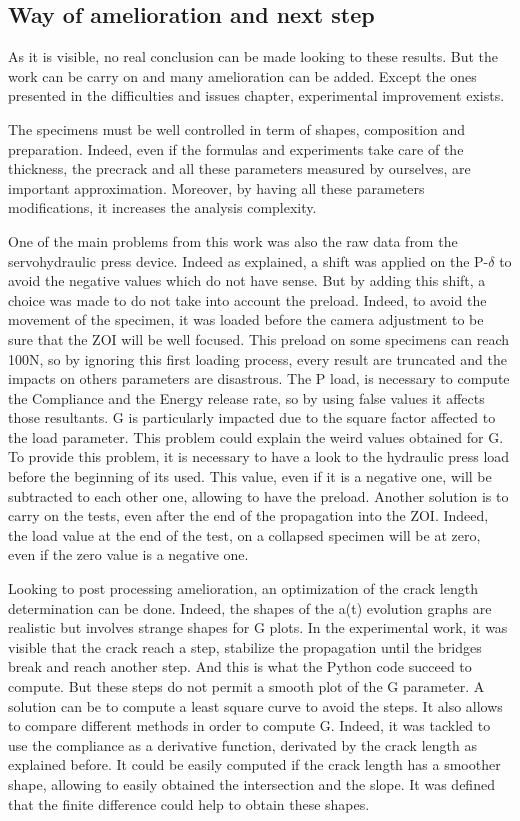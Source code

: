 \subsection{Way of amelioration and next step}

As it is visible, no real conclusion can be made looking to these results. But the work can be carry on and many amelioration can be added. Except the ones presented in the difficulties and issues chapter, experimental improvement exists. 

The specimens must be well controlled in term of shapes, composition and preparation. Indeed, even if the formulas and experiments take care of the thickness, the precrack and all these parameters measured by ourselves, are important approximation. Moreover, by having all these parameters modifications, it increases the analysis complexity.

One of the main problems from this work was also the raw data from the servohydraulic press device. Indeed as explained, a shift was applied on the P-$\delta$ to avoid the negative values which do not have sense. But by adding this shift, a choice was made to do not take into account the preload. Indeed, to avoid the movement of the specimen, it was loaded before the camera adjustment to be sure that the ZOI will be well focused. This preload on some specimens can reach 100\si{\newton}, so by ignoring this first loading process, every result are truncated and the impacts on others parameters are disastrous. The P load, is necessary to compute the Compliance and the Energy release rate, so by using false values it affects those resultants. G is particularly impacted due to the square factor affected to the load parameter. This problem could explain the weird values obtained for G. To provide this problem, it is necessary to have a look to the hydraulic press load before the beginning of its used. This value, even if it is a negative one, will be subtracted to each other one, allowing to have the preload. Another solution is to carry on the tests, even after the end of the propagation into the ZOI. Indeed, the load value at the end of the test, on a collapsed specimen will be at zero, even if the zero value is a negative one. 

Looking to post processing amelioration, an optimization of the crack length determination can be done. Indeed, the shapes of the a(t) evolution graphs are realistic but involves strange shapes for G plots. In the experimental work, it was visible that the crack reach a step, stabilize the propagation until the bridges break and reach another step. And this is what the Python code succeed to compute. But these steps do not permit a smooth plot of the G parameter. A solution can be to compute a least square curve to avoid the steps. It also allows to compare different methods in order to compute G. Indeed, it was tackled to use the compliance as a derivative function, derivated by the crack length as explained before. It could be easily computed if the crack length has a smoother shape, allowing to easily obtained the intersection and the slope. It was defined that the finite difference could help to obtain these shapes. 


